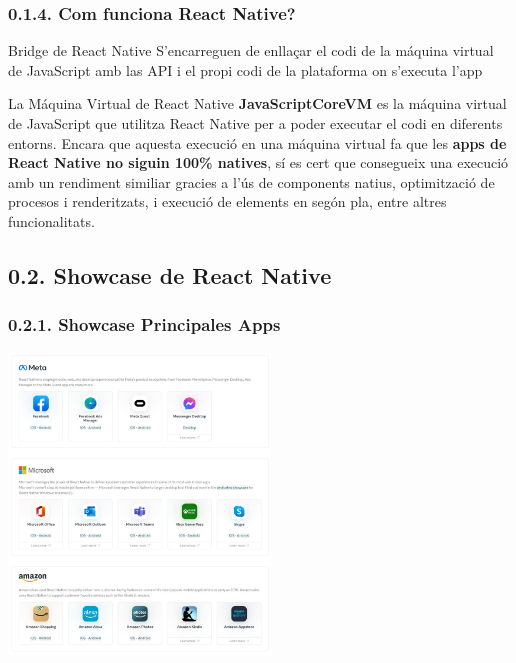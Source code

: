 \documentclass[12pt]{beamer}
\begin{document}
	\subsubsection{0.1.4. Com funciona React Native?}
	\begin{frame}
		\begin{block}{Bridge de React Native}
			S'encarreguen de enllaçar el codi de la máquina virtual de JavaScript amb las API i el propi codi de la plataforma on s'executa l'app
		\end{block}
		\begin{block}{La Máquina Virtual de React Native}
			\textbf{JavaScriptCoreVM} es la máquina virtual de JavaScript que utilitza React Native per a poder executar el codi en diferents entorns. Encara que aquesta execució en una máquina virtual fa que les \textbf{apps de React Native no siguin 100\% natives}, sí es cert que consegueix una execució amb un rendiment similiar gracies a l'ús de components natius, optimització de procesos i renderitzats, i execució de elements en segón pla, entre altres funcionalitats.
		\end{block}
	\end{frame}
	\subsection{0.2. Showcase de React Native}
	\subsubsection{0.2.1. Showcase Principales Apps}
	\begin{frame}
		\centering\includegraphics[height=8cm]{Showcase1.JPG}
	\end{frame}
\end{document}
